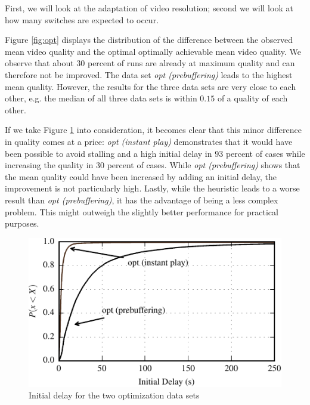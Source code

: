 First, we will look at the adaptation of video resolution; second we will look at how many switches are expected to occur.

Figure \ref{fig:opt} displays the distribution of the difference between the observed mean video quality and the optimal optimally achievable mean video quality. We observe that about $30$ percent of runs are already at maximum quality and can therefore not be improved. The data set \textit{opt (prebuffering)} leads to the highest mean quality. However, the results for the three data sets are very close to each other, e.g. the median of all three data sets is within $0.15$ of a quality of each other.

If we take Figure \ref{fig:initial_delay} into consideration, it becomes clear that this minor difference in quality comes at a price: \textit{opt (instant play)} demonstrates that it would have been possible to avoid stalling and a high initial delay in $93$ percent of cases while increasing the quality in $30$ percent of cases. While \textit{opt (prebuffering)} shows that the mean quality could have been increased by adding an initial delay, the improvement is not particularly high. Lastly, while the heuristic leads to a worse result than \textit{opt (prebuffering)}, it has the advantage of being a less complex problem. This might outweigh the slightly better performance for practical purposes.

\begin{figure}[t]
\centering
\includegraphics[width=1.02\columnwidth]{figs/initial_delay_py}%
\caption{Initial delay for the two optimization data sets}
\label{fig:initial_delay}%
\end{figure}

